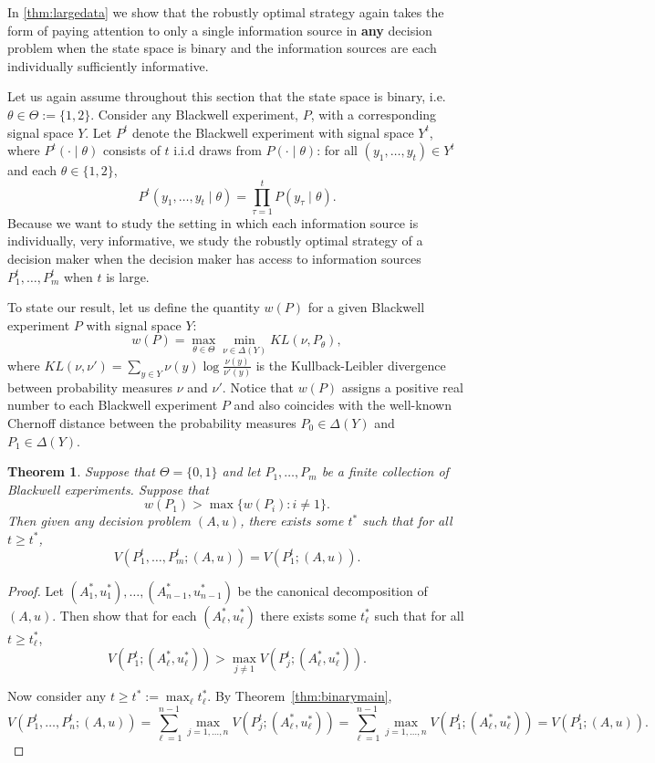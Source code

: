 \documentclass[11pt]{article}
\theoremstyle{plain}
\newtheorem{thm}{Theorem}
\theoremstyle{remark}
\begin{document}
In \autoref{thm:largedata} we show that the robustly optimal strategy again takes the form of paying attention to only a single information source in \textbf{any} decision problem when the state space is binary and the information sources are each individually sufficiently informative.  

Let us again assume throughout this section that the state space is binary, i.e. $\theta \in \Theta := \{1,2\}$.  Consider any Blackwell experiment, $P$, with a corresponding signal space $Y$.  Let $P^t$ denote the Blackwell experiment with signal space $Y^t$, where $P^t(\cdot \mid \theta)$ consists of $t$ i.i.d draws from $P(\cdot \mid \theta)$: for all $(y_1, \ldots , y_t) \in Y^t$ and each $\theta \in \{1,2\}$,
\[
P^t(y_1 , \ldots , y_t \mid \theta) = \prod_{\tau = 1}^{t} P(y_\tau \mid \theta).
\]
Because we want to study the setting in which each information source is individually, very informative, we study the robustly optimal strategy of a decision maker when the decision maker has access to information sources $P_1^t, \ldots , P_m^t$ when $t$ is large.  


To state our result, let us define the quantity $w(P)$ for a given Blackwell experiment $P$ with signal space $Y$: 
\[
w(P) = \max_{\theta \in \Theta} \min_{\nu \in \Delta(Y)} KL(\nu, P_\theta),
\]
where $KL(\nu, \nu') = \sum_{y \in Y} \nu(y) \log \frac{\nu(y)}{\nu'(y)}$ is the Kullback-Leibler divergence between probability measures $\nu$ and  $\nu'$.  Notice that $w(P)$ assigns a positive real number to each Blackwell experiment $P$ and also coincides with the well-known Chernoff distance between the probability measures $P_{0} \in \Delta(Y)$ and $P_1 \in \Delta(Y)$.


\begin{thm}\label{thm:largedata}
Suppose that $\Theta = \{0,1\}$ and let $P_1, \ldots, P_m$ be a finite collection of Blackwell experiments.  Suppose that 
\[
w(P_1) >\max\{ w(P_i) : i \neq 1\}.
\]
Then given any decision problem $(A,u)$, there exists some $t^*$ such that for all $t \geq t^*$,
\[
V(P_1^t, \ldots , P_m^t; (A,u)) = V(P_1^t; (A,u)).
\]
\end{thm}



\begin{proof}
Let $(A_1^*, u_1^*), \ldots , (A_{n - 1}^*, u_{n-1}^*)$ be the canonical decomposition of $(A, u)$.  Then \cite{moscarini2002law} show that for each $(A_\ell^*, u_\ell^*)$ there exists some $t^*_\ell$ such that for all $t \geq t_\ell^*$,
\[
V(P_1^t;(A_\ell^*,u_\ell^*))> \max_{j \neq 1} V(P_j^t;(A^*_\ell,u_\ell^*)).
\]

Now consider any $t \geq t^* := \max_{\ell} t_\ell^*$. By Theorem~\ref{thm:binarymain}, 
\[
V(P_1^t, \ldots , P_n^t; (A,u)) = \sum_{\ell = 1}^{n - 1} \max_{j= 1, \ldots , n} V(P_j^t;(A^*_\ell,u_\ell^*)) = \sum_{\ell = 1}^{n - 1} \max_{j= 1, \ldots , n} V(P_1^t;(A^*_\ell,u_\ell^*)) = V(P_1^t; (A,u)).
\]
\end{proof}
\end{document}
